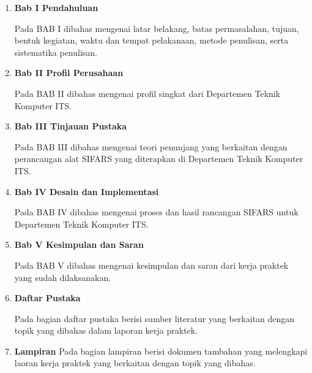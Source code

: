 \begin{enumerate}[nolistsep]

  \item \textbf{Bab I Pendahuluan}

  Pada BAB I dibahas mengenai latar belakang, batas permasalahan, tujuan, bentuk kegiatan, waktu dan tempat pelakanaan, metode penulisan, serta sistematika penulisan.

  \item \textbf{Bab II Profil Perusahaan}

  Pada BAB II dibahas mengenai profil singkat dari Departemen Teknik Komputer ITS.

  \item \textbf{Bab III Tinjauan Pustaka}

  Pada BAB III dibahas mengenai teori penunjang yang berkaitan dengan perancangan alat SIFARS yang diterapkan di Departemen Teknik Komputer ITS.

  \item \textbf{Bab IV Desain dan Implementasi}

  Pada BAB IV dibahas mengenai proses dan hasil rancangan SIFARS untuk Departemen Teknik Komputer ITS.

  \item \textbf{Bab V Kesimpulan dan Saran}

  Pada BAB V dibahas mengenai kesimpulan dan saran dari kerja praktek yang sudah dilaksanakan.

  \item \textbf{Daftar Pustaka}

  Pada bagian daftar pustaka berisi sumber literatur yang berkaitan dengan topik yang dibahas dalam laporan kerja praktek.
  
   \item \textbf{Lampiran}
   Pada bagian lampiran berisi dokumen tambahan yang melengkapi laoran kerja praktek yang berkaitan dengan topik yang dibahas.



\end{enumerate}
